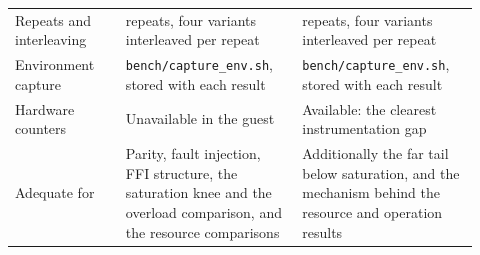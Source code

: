 \documentclass[english,oneside,a4paper,censored,csm,software-track-2020]{HYthesisML}
\begin{document}
\begin{appendices}
\begin{table}[H]
\begin{tabular}{@{}R{0.22\linewidth} R{0.35\linewidth} R{0.35\linewidth}@{}}
Repeats and interleaving & \NRepeats{} repeats, four variants interleaved per repeat & \NRepeats{} repeats, four variants interleaved per repeat \\
Environment capture & \texttt{bench/capture\_env.sh}, stored with each result & \texttt{bench/capture\_env.sh}, stored with each result \\
Hardware counters & Unavailable in the guest & Available: the clearest instrumentation gap \\
\hline
Adequate for & Parity, fault injection, FFI structure, the saturation knee and the overload comparison, and the resource comparisons & Additionally the far tail below saturation, and the mechanism behind the resource and operation results \\
\hline
\end{tabular}
\end{table}


\end{appendices}
\end{document}

